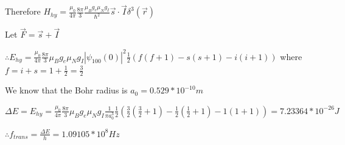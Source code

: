 \documentclass[12pt]{article}
\begin{document}
\begin{spacing}{2.0}
Therefore $H_{hy}= \frac{\mu_0}{4\pi} \frac{8\pi}{3} \frac{\mu_B g_e\mu_N g_I}{\hbar^2} \vec{s} \cdot \vec{I} \delta^3(\vec{r})$

Let $\vec{F}= \vec{s}+\vec{I}$

$\therefore E_{hy}=\frac{\mu_0}{4\pi} \frac{8\pi}{3} \mu_B g_e\mu_N g_I|\psi_{100}(0)|^2 \frac{1}{2} (f(f+1)-s(s+1)-i(i+1))$ where $f=i+s= 1+\frac{1}{2}= \frac{3}{2}$

We know that the Bohr radius is $a_0=0.529*10^{-10}m $

$\Delta E = E_{hy}=\frac{\mu_0}{4\pi} \frac{8\pi}{3} \mu_B g_e\mu_N g_I \frac{1}{\pi a_0^3} \frac{1}{2} (\frac{3}{2}(\frac{3}{2}+1)- \frac{1}{2}(\frac{1}{2}+1)- 1(1+1)) = 7.23364*10^{-26} J$

$\therefore f_{trans}= \frac{\Delta E}{h}= 1.09105*10^8 Hz$

\end{spacing}
\end{document}
